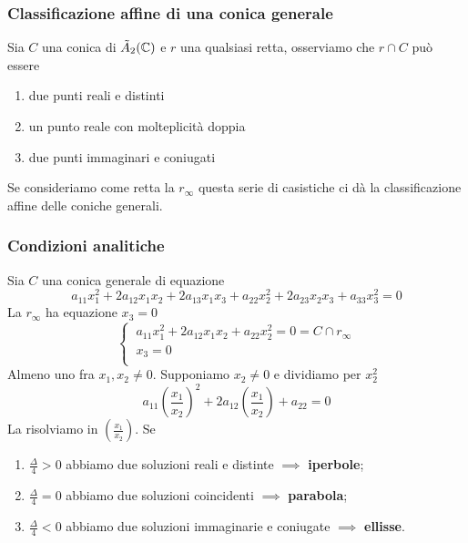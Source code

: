 \subsubsection{Classificazione affine di una conica generale}
Sia \(C\) una conica di \(\tilde{A}_{2}(\CC) \) e \(r\) una qualsiasi retta, osserviamo che \(r \cap C\) può essere
\begin{enumerate}
    \item due punti reali e distinti
    \item un punto reale con molteplicità doppia
    \item due punti immaginari e coniugati
\end{enumerate}
Se consideriamo come retta la \(r_{\infty}\) questa serie di casistiche ci dà la classificazione affine delle coniche generali.


\subsubsection{Condizioni analitiche}
Sia \(C\) una conica generale di equazione \[
a_{11}x_1^2+ 2a_{12}x_1x_2+2a_{13}x_1x_3+a_{22}x_2^2+2a_{23}x_2x_3+a_{33}x_3^2=0
\] 
La \(r_{\infty}\) ha equazione \(x_{3}=0\) \[
\begin{cases}
    \ a_{11}x_1^2+2a_{12}x_1x_2+a_{22}x_2^2= 0 = C \cap r_{\infty} \\
    \ x_3 = 0 \\
\end{cases}
\]
Almeno uno fra \(x_1, x_2 \neq 0\). Supponiamo \(x_2 \neq 0\) e dividiamo per \(x_2^2\) \[
a_{11} \left( \frac{x_1}{x_2} \right) ^2 + 2a_{12} \left( \frac{x_1}{x_2} \right)  + a_{22} = 0
\] 
La risolviamo in \(\left( \frac{x_1}{x_2} \right) \). Se 
\begin{enumerate}
    \item \(\frac{\Delta}{4} > 0\) abbiamo due soluzioni reali e distinte \(\implies \) \textbf{iperbole};
    \item \(\frac{\Delta}{4} = 0\) abbiamo due soluzioni coincidenti \(\implies \) \textbf{parabola};
    \item \(\frac{\Delta}{4} < 0\) abbiamo due soluzioni immaginarie e coniugate \(\implies \) \textbf{ellisse}.
\end{enumerate}

